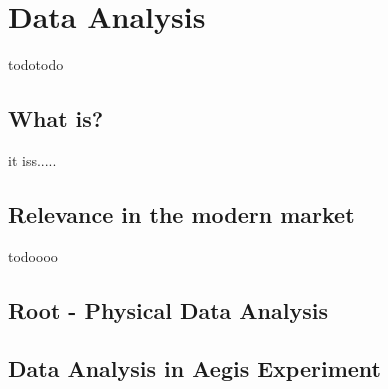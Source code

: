 
\chapter{Data Analysis} %

\label{Chapter2} %


todotodo 


\section{What is?}
it iss.....
\section{Relevance in the modern market}

todoooo

\section{Root - Physical Data Analysis }

\section{Data Analysis in Aegis Experiment}


